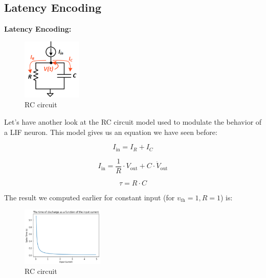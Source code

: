 \subsection{Latency Encoding}

\textbf{Latency Encoding:}

\begin{figure}
    \centering
    \includegraphics[width=0.25\textwidth]{methods/spike-encoding/graphs/LIF-circuit.png}
    \caption{RC circuit}
    \label{image:LIF_circuit}
  \end{figure}

Let's have another look at the RC circuit model used to modulate the behavior of a LIF neuron. This model gives us an equation we have seen before:

\begin{equation}
    I_{\text{in}} = I_R + I_C
\end{equation}

\begin{equation}
    I_{\text{in}} = \frac{1}{R} \cdot V_{\text{out}} + C \cdot \dot{V}_{\text{out}}
\end{equation}

\begin{equation}
    \tau = R \cdot C
\end{equation}


The result we computed earlier for constant input (for $v_{\text{th}} = 1, R = 1$) is:

\begin{figure}
    \centering
    \includegraphics[width=0.35\textwidth]{methods/spike-encoding/graphs/exponential-decay.png}
    \caption{RC circuit}
    \label{image:exponential_decay}
\end{figure}

